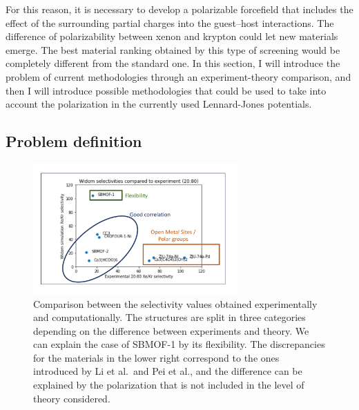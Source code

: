 \documentclass[main]{subfiles}
\begin{document}
For this reason, it is necessary to develop a polarizable forcefield that includes the effect of the surrounding partial charges into the guest--host interactions. The difference of polarizability between xenon and krypton could let new materials emerge. The best material ranking obtained by this type of screening would be completely different from the standard one. In this section, I will introduce the problem of current methodologies through an experiment-theory comparison, and then I will introduce possible methodologies that could be used to take into account the polarization in the currently used Lennard-Jones potentials.

\subsection{Problem definition}

\begin{figure}[ht]
  \centering
  \includegraphics[width=0.7\textwidth]{figures/6-perspectives/exp_theory_discrepancies.pdf}
  \caption{ Comparison between the selectivity values obtained experimentally and computationally. The structures are split in three categories depending on the difference between experiments and theory. We can explain the case of SBMOF-1 by its flexibility. The discrepancies for the materials in the lower right correspond to the ones introduced by Li et al.\ and Pei et al.,\autocite{Li_2019,Pei_2022} and the difference can be explained by the polarization that is not included in the level of theory considered.  }\label{fgr:exp_theory_discrepancy}
\end{figure}
\end{document}
